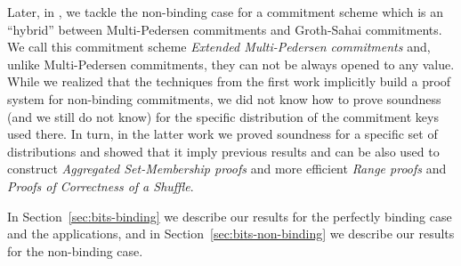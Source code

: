 Later, in \cite{ACNS:GonRaf16}, we tackle the non-binding case for a commitment scheme which is an ``hybrid'' between Multi-Pedersen commitments and Groth-Sahai commitments. We call this commitment scheme \emph{Extended Multi-Pedersen commitments} and, unlike Multi-Pedersen commitments, they can not be always opened to any value. 
While we realized that the techniques from the first work implicitly build a proof system for non-binding commitments, we did not know how to prove soundness (and we still do not know) for the specific distribution of the commitment keys used there. In turn, in the latter work we proved soundness for a specific set of distributions and showed that it imply previous results and can be also used to construct \emph{Aggregated Set-Membership proofs} and more efficient \emph{Range proofs} and \emph{Proofs of Correctness of a Shuffle}.

In Section~\ref{sec:bits-binding} we describe our results for the perfectly binding case and the applications, and in Section~\ref{sec:bits-non-binding} we describe our results for the non-binding case.
